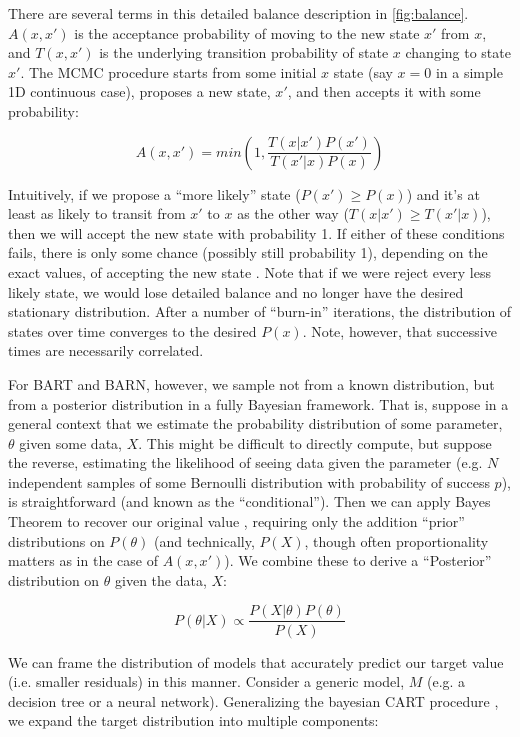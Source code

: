 \documentclass[12pt]{article}
\begin{document}
There are several terms in this detailed balance description in \autoref{fig:balance}.  $A(x,x')$ is the acceptance probability of moving to the new state $x'$ from $x$, and $T(x,x')$ is the underlying transition probability of state $x$ changing to state $x'$.  The MCMC procedure starts from some initial $x$ state (say $x=0$ in a simple 1D continuous case), proposes a new state, $x'$, and then accepts it with some probability:

$$
A(x,x') = min(1, \frac{T(x|x') P(x')}{T(x'|x) P(x)})
$$

Intuitively, if we propose a ``more likely'' state ($P(x') \geq P(x)$) and it's at least as likely to transit from $x'$ to $x$ as the other way ($T(x|x') \geq T(x'|x)$), then we will accept the new state with probability 1.  If either of these conditions fails, there is only some chance (possibly still probability 1), depending on the exact values, of accepting the new state \cite{stepanov2021math}.  Note that if we were reject every less likely state, we would lose detailed balance and no longer have the desired stationary distribution.  After a number of ``burn-in'' iterations, the distribution of states over time converges to the desired $P(x)$.  Note, however, that successive times are necessarily correlated.


For BART and BARN, however, we sample not from a known distribution, but from a posterior distribution in a fully Bayesian framework.  That is, suppose in a general context that we estimate the probability distribution of some parameter, $\theta$ given some data, $X$.  This might be difficult to directly compute, but suppose the reverse, estimating the likelihood of seeing data given the parameter (e.g. $N$ independent samples of some Bernoulli distribution with probability of success $p$), is straightforward (and known as the ``conditional'').  Then we can apply Bayes Theorem to recover our original value \cite{casella2021statistical}, requiring only the addition ``prior'' distributions on $P(\theta)$ (and technically, $P(X)$, though often proportionality matters as in the case of $A(x,x')$).  We combine these to derive a ``Posterior'' distribution on $\theta$ given the data, $X$:

$$
P(\theta|X) \propto \frac{P(X|\theta)P(\theta)}{P(X)}
$$


We can frame the distribution of models that accurately predict our target value (i.e. smaller residuals) in this manner.  Consider a generic model, $M$ (e.g. a decision tree or a neural network).  Generalizing the bayesian CART procedure \cite{chipman1998bayesian}, we expand the target distribution into multiple components: 
\end{document}
